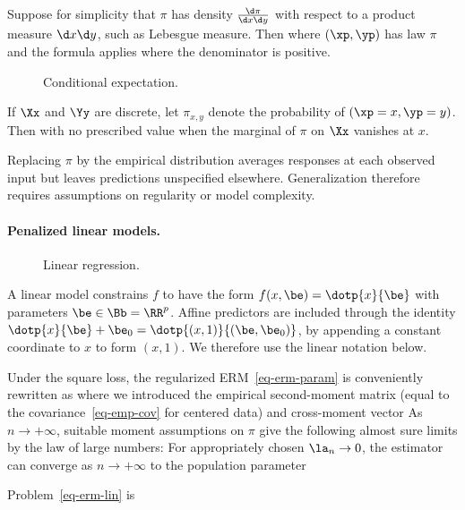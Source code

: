 Suppose for simplicity that $\pi$ has density $\frac{\d \pi}{\d x \d y}$ with respect to a product measure $\d x \d y$, such as Lebesgue measure. Then
where $(\xp,\yp)$ has law $\pi$ and the formula applies where the denominator is positive.


\begin{figure}[tbp]
\centering
{}
\caption{Conditional expectation.}
\label{fig-bound-regul}
\end{figure}

If $\Xx$ and $\Yy$ are discrete, let $\pi_{x,y}$ denote the probability of $(\xp=x,\yp=y)$. Then
with no prescribed value when the marginal of $\pi$ on $\Xx$ vanishes at $x$.

Replacing $\pi$ by the empirical distribution averages responses at each observed input but leaves predictions unspecified elsewhere. Generalization therefore requires assumptions on regularity or model complexity.


   
\paragraph{Penalized linear models.}

\begin{figure}[tbp]
\centering
{}
\caption{Linear regression.}
\label{fig-review-ml-linear-fit}
\end{figure}
A linear model constrains $f$ to have the form $f(x,\be)=\dotp{x}{\be}$ with parameters $\be \in \Bb=\RR^p$. Affine predictors are included through the identity $\dotp{x}{\be}+\be_0=\dotp{(x,1)}{(\be,\be_0)}$, by appending a constant coordinate to $x$ to form $(x,1)$. We therefore use the linear notation below.

Under the square loss, the regularized ERM~\eqref{eq-erm-param} is conveniently rewritten as 
where we introduced the empirical second-moment matrix (equal to the covariance~\eqref{eq-emp-cov} for centered data) and cross-moment vector
As $n\to+\infty$, suitable moment assumptions on $\pi$ give the following almost sure limits by the law of large numbers:
For appropriately chosen $\la_n \rightarrow 0$, the estimator can converge as $n \rightarrow +\infty$ to the population parameter

Problem~\eqref{eq-erm-lin} is 
